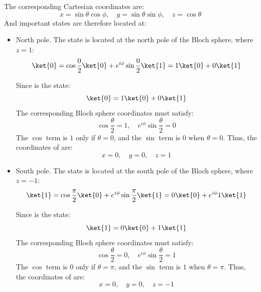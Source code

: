 \highspace
The corresponding Cartesian coordinates are:
\begin{equation*}
    x = \sin\theta \cos\phi, \quad
    y = \sin\theta \sin\phi, \quad
    z = \cos\theta
\end{equation*}
And important states are therefore located at:
\begin{itemize}
    \item North pole. The state  is located at the north pole of the Bloch sphere, where $z=1$:
        \begin{equation*}
            \ket{0} = \cos\frac{0}{2}\ket{0} + e^{i\phi}\sin\frac{0}{2}\ket{1} = 1\ket{0} + 0\ket{1}
        \end{equation*}

        \begin{remarkbox}
            Since  is the state:
            \begin{equation*}
                \ket{0} = 1\ket{0} + 0\ket{1}
            \end{equation*}
            The corresponding Bloch sphere coordinates must satisfy:
            \begin{equation*}
                \cos\frac{\theta}{2} = 1, \quad e^{i\phi}\sin\frac{\theta}{2} = 0
            \end{equation*}
            The $\cos$ term is $1$ only if $\theta=0$, and the $\sin$ term is $0$ when $\theta=0$. Thus, the coordinates of  are:
            \begin{equation*}
                x = 0, \quad y = 0, \quad z = 1
            \end{equation*}
        \end{remarkbox}

    \item South pole. The state  is located at the south pole of the Bloch sphere, where $z=-1$:
        \begin{equation*}
            \ket{1} = \cos\frac{\pi}{2}\ket{0} + e^{i\phi}\sin\frac{\pi}{2}\ket{1} = 0\ket{0} + e^{i\phi}1\ket{1}
        \end{equation*}
        \begin{remarkbox}
            Since  is the state:
            \begin{equation*}
                \ket{1} = 0\ket{0} + 1\ket{1}
            \end{equation*}
            The corresponding Bloch sphere coordinates must satisfy:
            \begin{equation*}
                \cos\frac{\theta}{2} = 0, \quad e^{i\phi}\sin\frac{\theta}{2} = 1
            \end{equation*}
            The $\cos$ term is $0$ only if $\theta=\pi$, and the $\sin$ term is $1$ when $\theta=\pi$. Thus, the coordinates of  are:
            \begin{equation*}
                x = 0, \quad y = 0, \quad z = -1
            \end{equation*}
        \end{remarkbox}


\end{itemize}
